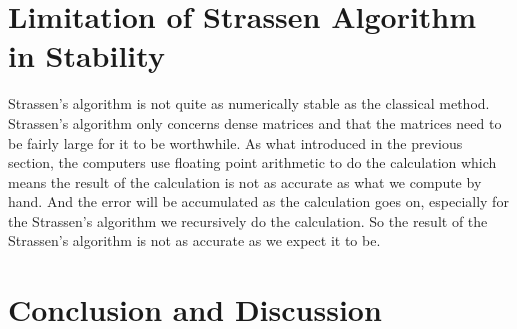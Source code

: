 \documentclass{article}
\begin{document}
\section{Limitation of Strassen Algorithm in Stability}
\hspace{5.5mm}Strassen's algorithm is not quite as numerically stable as the classical method. Strassen's algorithm only concerns dense matrices and that the matrices need to be fairly large for it to be worthwhile. As what introduced in the
previous section, the computers use floating point arithmetic to do the calculation which means the result of the calculation is not as accurate as what we compute by hand. And the error will be accumulated as the calculation 
goes on, especially for the Strassen's algorithm we recursively do the calculation. So the result of the Strassen's algorithm is not as accurate as we expect it to be.\\

\section{Conclusion and Discussion}
\end{document}
